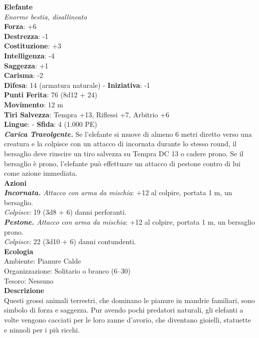 \begin{multicols}{2}
\medskip\textbf{Elefante}\\
\emph{Enorme bestia, disallineato}\\
\textbf{Forza}: +6\\
\textbf{Destrezza}: -1\\
\textbf{Costituzione}: +3\\
\textbf{Intelligenza}: -4\\
\textbf{Saggezza}: +1\\
\textbf{Carisma}: -2\\
\textbf{Difesa}: 14 (armatura naturale) - \textbf{Iniziativa}: -1\\
\textbf{Punti Ferita}: 76 (8d12 + 24)\\
\textbf{Movimento}: 12 m\\
\textbf{Tiri Salvezza}: Tempra +13, Riflessi +7, Arbitrio +6 \\
\textbf{Lingue}: -
\textbf{Sfida}: 4 (1.000 PE)\smallskip\\
\emph{\textbf{Carica Travolgente.}} Se l'elefante si muove di almeno 6 metri diretto verso una creatura e la colpisce con un attacco di incornata durante lo stesso round, il bersaglio deve riuscire un tiro salvezza su Tempra DC  13 o cadere prono. Se il bersaglio è prono, l'elefante può effettuare un attacco di pestone contro di lui come azione immediata.\\
\smallskip\textbf{Azioni}\\
\emph{\textbf{Incornata.} Attacco con arma da mischia}: +12 al colpire, portata 1 m, un bersaglio.\\
\emph{Colpisce:} 19 (3d8 + 6) danni perforanti.\\
\emph{\textbf{Pestone.} Attacco con arma da mischia}: +12 al colpire, portata 1 m, un bersaglio prono.\\
\emph{Colpisce:} 22 (3d10 + 6) danni contundenti.\\
\textbf{Ecologia}\\
Ambiente: Pianure Calde\\
Organizzazione: Solitario o branco (6–30)\\
Tesoro: Nessuno\\
\textbf{Descrizione}\\

Questi grossi animali terrestri, che dominano le pianure in mandrie familiari, sono simbolo di forza e saggezza. Pur avendo pochi predatori naturali, gli elefanti a volte vengono cacciati per le loro zanne d’avorio, che diventano gioielli, statuette e ninnoli per i più ricchi. \\


\end{multicols}
